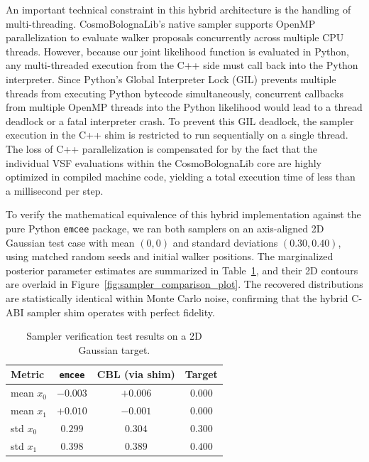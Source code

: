 \documentclass[12pt]{report}
\begin{document}
An important technical constraint in this hybrid architecture is the handling of multi-threading. CosmoBolognaLib's native sampler supports OpenMP parallelization to evaluate walker proposals concurrently across multiple CPU threads. However, because our joint likelihood function is evaluated in Python, any multi-threaded execution from the C++ side must call back into the Python interpreter. Since Python's Global Interpreter Lock (GIL) prevents multiple threads from executing Python bytecode simultaneously, concurrent callbacks from multiple OpenMP threads into the Python likelihood would lead to a thread deadlock or a fatal interpreter crash. To prevent this GIL deadlock, the sampler execution in the C++ shim is restricted to run sequentially on a single thread. The loss of C++ parallelization is compensated for by the fact that the individual VSF evaluations within the CosmoBolognaLib core are highly optimized in compiled machine code, yielding a total execution time of less than a millisecond per step.

To verify the mathematical equivalence of this hybrid implementation against the pure Python \texttt{emcee} package, we ran both samplers on an axis-aligned 2D Gaussian test case with mean $(0, 0)$ and standard deviations $(0.30, 0.40)$, using matched random seeds and initial walker positions. The marginalized posterior parameter estimates are summarized in Table~\ref{tab:sampler_comparison}, and their 2D contours are overlaid in Figure~\ref{fig:sampler_comparison_plot}. The recovered distributions are statistically identical within Monte Carlo noise, confirming that the hybrid C-ABI sampler shim operates with perfect fidelity.

\begin{table}[H]
    \centering
    \caption{Sampler verification test results on a 2D Gaussian target.}
    \label{tab:sampler_comparison}
    \begin{tabular}{lccc}
        \toprule
        \textbf{Metric} & \textbf{\texttt{emcee}} & \textbf{CBL (via shim)} & \textbf{Target} \\
        \midrule
        mean $x_0$    & $-0.003$ & $+0.006$ & $0.000$ \\
        mean $x_1$    & $+0.010$ & $-0.001$ & $0.000$ \\
        std $x_0$     & $0.299$  & $0.304$  & $0.300$ \\
        std $x_1$     & $0.398$  & $0.389$  & $0.400$ \\
        \bottomrule
    \end{tabular}
\end{table}
\end{document}

